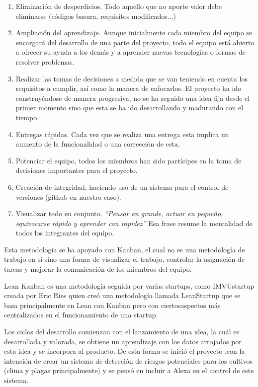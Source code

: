 \documentclass[runningheads]{llncs}
\begin{document}
\begin{enumerate}
\item Eliminación de desperdicios. Todo aquello que no aporte valor debe
eliminarse (códigos basura, requisitos modificados...)

\item Ampliación del aprendizaje. Aunque inicialmente cada miembro del
equipo se encargará del desarrollo de una parte del proyecto, todo el
equipo está abierto a ofrecer su ayuda a los demás y a aprender nuevas
tecnologías o formas de resolver problemas.
\item Realizar las tomas de decisiones a medida que se van teniendo en
cuenta los requisitos a cumplir, así como la manera de enfocarlos. El
proyecto ha ido construyéndose de manera progresiva, no se ha seguido
una idea fija desde el primer momento sino que esta se ha ido
desarrollando y madurando con el tiempo.

\item Entregas rápidas. Cada vez que se realiza una entrega esta implica
un aumento de la funcionalidad o una corrección de esta.


\item Potenciar el equipo, todos los miembros han sido partícipes en la
toma de decisiones importantes para el proyecto.

\item Creación de integridad, haciendo uso de un sistema para el control
de versiones (github en nuestro caso).

\item Visualizar todo en conjunto. \textit{“Pensar en grande, actuar en
pequeño, equivocarse rápido y aprender con rapidez”} Esa frase resume la
mentalidad de todos los integrantes del equipo. \newline

\end{enumerate}
Esta metodología se ha apoyado con Kanban, el cual no es una metodología
de trabajo en sí sino una forma de visualizar el trabajo, controlar la
asignación de tareas y mejorar la comunicación de los miembros del
equipo.


Lean Kanban es una metodología seguida por varías startups, como IMVUstartup creada por Eric Ries quien creó una metodología llamada LeanStartup que se basa principalmente en Lean con Kanban pero con ciertosaspectos más centralizados en el funcionamiento de una startup.

Los ciclos del desarrollo comienzan con el lanzamiento de una idea, la
cuál es desarrollada y valorada, se obtiene un aprendizaje con los datos
arrojados por esta idea y se incorpora al producto. De esta forma se
inició el proyecto ,con la intención de crear un sistema de detección de
riesgos potenciales para los cultivos (clima y plagas principalmente) y
se pensó en incluir a Alexa en el control de este sistema.
\end{document}
